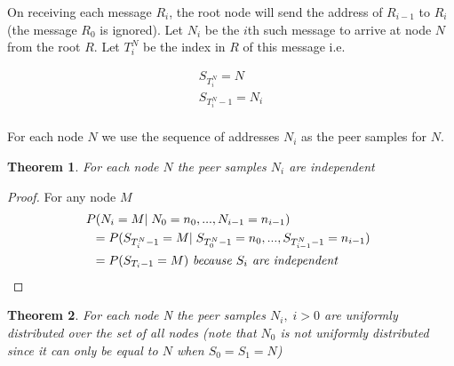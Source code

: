 \documentclass[a4paper,10pt]{article}
\newtheorem*{thm}{Theorem}
\begin{document}
On receiving each message $R_i$, the root node will send the address of $R_{i-1}$ to $R_i$ (the message $R_0$ is ignored). Let $N_i$ be the $i$th such message to arrive at node $N$ from the root $R$. Let $T^N_i$ be the index in $R$ of this message i.e.

\begin{gather*}
S_{T^N_i} = N \\
S_{T^N_i-1} = N_i \\
\end{gather*}

For each node $N$ we use the sequence of addresses $N_i$ as the peer samples for $N$.

\begin{thm}For each node $N$ the peer samples $N_i$ are independent\end{thm}

\begin{proof}
For any node $M$
\begin{align*}
& \!\!\! P(N_i = M |\; N_0=n_0, ... ,N_{i-1} = n_{i-1}) \\
& = P(S_{T^N_i-1} = M |\; S_{T^N_0-1} = n_0, ... ,S_{T^N_{i-1}-1} = n_{i-1}) \\
& = P(S_{T_i-1} = M) \text{ \em because $S_i$ are independent \em} \\
\end{align*}
\end{proof}

\begin{thm}For each node N the peer samples $N_i, \; i>0$ are uniformly distributed over the set of all nodes (note that $N_0$ is not uniformly distributed since it can only be equal to $N$ when $S_0 = S_1 = N$)\end{thm}
\end{document}
